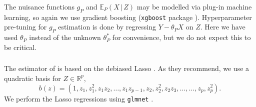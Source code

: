 \documentclass[aos]{imsart}
\newcommand{\R}{\mathbb{R}}
\newcommand{\E}{\mathbb{E}}
\newcommand{\given}{\,|\,}
\begin{document}
	The nuisance functions $g_P$ and $\E_P(X\given  Z)$ may be modelled via plug-in machine learning, so again we use gradient boosting (\texttt{xgboost} package \citep{xgboost}). Hyperparameter pre-tuning for $g_P$ estimation is done by regressing $Y-\theta_PX$ on $Z$. Here we have used $\theta_P$ instead of the unknown $\theta_P^*$ for convenience, but we do not expect this to be critical.
	
	\subsubsection{\cite{RothenhauslerICE}}
	\label{sect:methodroth}
	The estimator of \cite{RothenhauslerICE} is based on the debiased Lasso \citep{ZhangDebiased, vandeGeerDebiased}. As they recommend, we use a quadratic basis for $Z\in\R^{p}$,\begin{equation*}
		b(z) = (1, z_1, z_1^2, z_1 z_2,\ldots, z_1 z_{p-1}, z_2, z_2^2, z_2 z_3,\ldots,\ldots, z_{p}, z_{p}^2).
	\end{equation*} 
	We perform the Lasso regressions using \texttt{glmnet} \citep{glmnet}.
	
	
	
\end{document}
